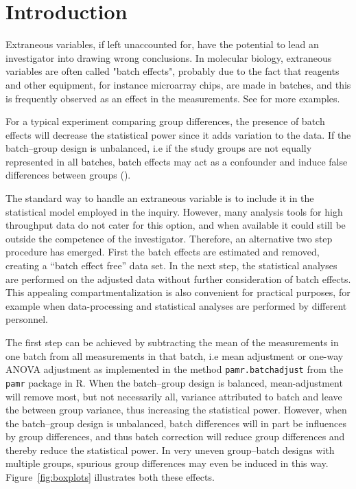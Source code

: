 \documentclass{bio}
\begin{document}
\section{Introduction}\label{intro}

Extraneous variables, if left unaccounted for, have the potential to lead an investigator into drawing wrong conclusions. In molecular biology, extraneous variables are often called "batch effects", probably due to the fact that reagents and other equipment, for instance microarray chips, are made in batches, and this is frequently observed as an effect in the measurements. See \citet{Luo2010} for more examples. 

For a typical experiment comparing group differences, the presence of batch effects will decrease the statistical power since it adds variation to the data. If the batch--group design is unbalanced, i.e if the study groups are not equally represented in all batches, batch effects may act as a confounder and induce false differences between groups (\citealp{Leek2010}).

The standard way to handle an extraneous variable is to include it in the statistical model employed in the inquiry. However, many analysis tools for high throughput data do not cater for this option, and when available it could still be outside the competence of the investigator. Therefore, an alternative two step procedure has emerged. First the batch effects are estimated and removed, creating a ``batch effect free'' data set. In the next step, the statistical analyses are performed on the adjusted data without further consideration of batch effects. This appealing compartmentalization is also convenient for practical purposes, for example when data-processing and statistical analyses are performed by different personnel.

The first step can be achieved by subtracting the mean of the measurements in one batch from all measurements in that batch, i.e mean adjustment or one-way ANOVA adjustment as implemented in the method \texttt{pamr.batchadjust} from the \texttt{pamr} package in R. When the batch--group design is balanced, mean-adjustment will remove most, but not necessarily all, variance attributed to batch and leave the between group variance, thus increasing the statistical power. However, when the batch--group design is unbalanced, batch differences will in part be influences by group differences, and thus batch correction will reduce group differences and thereby reduce the statistical power. In very uneven group--batch designs with multiple groups, spurious group differences may even be induced in this way. Figure~\ref{fig:boxplots} illustrates both these effects.
\end{document}

